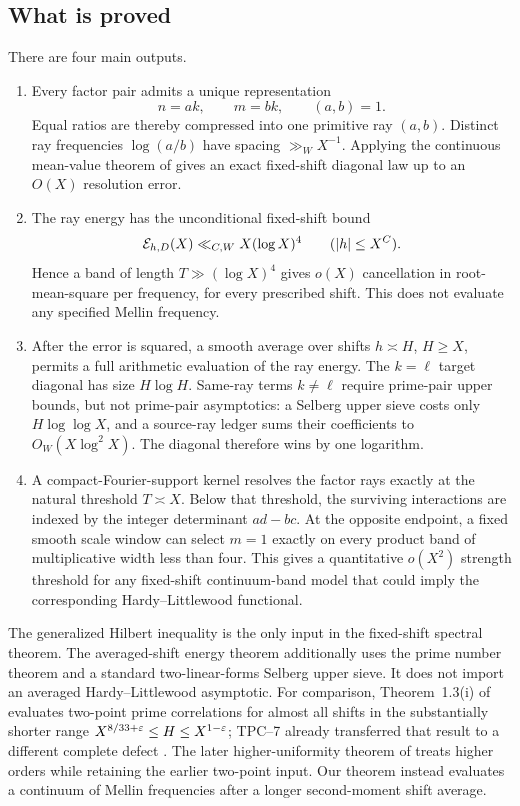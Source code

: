 \subsection{What is proved}

There are four main outputs.

\begin{enumerate}[label=\textup{(\roman*)}]
 \item Every factor pair admits a unique representation
 \[
  n=ak,\qquad m=bk,\qquad (a,b)=1.
 \]
 Equal ratios are thereby compressed into one primitive ray $(a,b)$.
 Distinct ray frequencies $\log(a/b)$ have spacing $\gg_W X^{-1}$.
 Applying the continuous mean-value theorem of
 \citet{MontgomeryVaughan1974} gives an exact fixed-shift diagonal law up
 to an $O(X)$ resolution error.

 \item The ray energy has the unconditional fixed-shift bound
 \[
  \mathcal E_{h,D}(X)\ll_{C,W}X(\log X)^4
  \qquad (|h|\leq X^C).
 \]
 Hence a band of length $T\gg(\log X)^4$ gives $o(X)$ cancellation in
 root-mean-square per frequency, for every prescribed shift.  This does
 not evaluate any specified Mellin frequency.

 \item After the error is squared, a smooth average over shifts
 $h\asymp H$, $H\geq X$, permits a full arithmetic evaluation of the ray
 energy.  The $k=\ell$ target diagonal has size $H\log H$.  Same-ray
 terms $k\ne\ell$ require prime-pair upper bounds, but not prime-pair
 asymptotics: a Selberg upper sieve costs only $H\log\log X$, and a
 source-ray ledger sums their coefficients to $O_W(X\log^2X)$.  The
 diagonal therefore wins by one logarithm.

 \item A compact-Fourier-support kernel resolves the factor rays exactly
 at the natural threshold $T\asymp X$.  Below that threshold, the
 surviving interactions are indexed by the integer determinant
 $ad-bc$.  At the opposite endpoint, a fixed smooth scale window can
 select $m=1$ exactly on every product band of multiplicative width less
 than four.  This gives a quantitative $o(X^2)$ strength threshold for
 any fixed-shift continuum-band model that could imply the corresponding
 Hardy--Littlewood functional.
\end{enumerate}

The generalized Hilbert inequality is the only input in the fixed-shift
spectral theorem.  The averaged-shift energy theorem additionally uses
the prime number theorem and a standard two-linear-forms Selberg upper
sieve.  It does not import an averaged Hardy--Littlewood asymptotic.
For comparison, Theorem~1.3(i) of
\citet{MatomakiRadziwillTao2019} evaluates two-point prime correlations for
almost all shifts in the substantially shorter range
$X^{8/33+\varepsilon}\leq H\leq X^{1-\varepsilon}$; TPC--7 already transferred that
result to a different complete defect \citep{WangTPC7}.  The later
higher-uniformity theorem of
\citet[Theorem~1.5]{MatomakiRadziwillShaoTaoTeravainen2026} treats higher
orders while retaining the earlier two-point input.  Our theorem instead
evaluates a continuum of Mellin frequencies after a longer second-moment
shift average.

